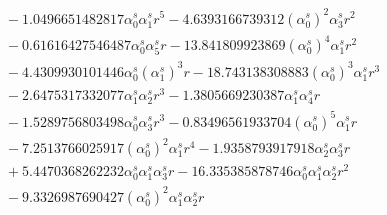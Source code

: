 \documentclass[10pt]{article}
\begin{document}
\begin{align*}
&{}  - 1.0496651482817 \alpha_{0}^s \alpha_{1}^s r^{5} - 4.6393166739312 \left(\alpha_{0}^s\right)^{2} \alpha_{3}^s r^{2} \\
&{}  - 0.61616427546487 \alpha_{0}^s \alpha_{5}^s r - 13.841809923869 \left(\alpha_{0}^s\right)^{4} \alpha_{1}^s r^{2} \\
&{}  - 4.4309930101446 \alpha_{0}^s \left(\alpha_{1}^s\right)^{3} r - 18.743138308883 \left(\alpha_{0}^s\right)^{3} \alpha_{1}^s r^{3} \\
&{}  - 2.6475317332077 \alpha_{1}^s \alpha_{2}^s r^{3} - 1.3805669230387 \alpha_{1}^s \alpha_{4}^s r \\
&{}  - 1.5289756803498 \alpha_{0}^s \alpha_{3}^s r^{3} - 0.83496561933704 \left(\alpha_{0}^s\right)^{5} \alpha_{1}^s r \\
&{}  - 7.2513766025917 \left(\alpha_{0}^s\right)^{2} \alpha_{1}^s r^{4} - 1.9358793917918 \alpha_{2}^s \alpha_{3}^s r \\
&{}  + 5.4470368262232 \alpha_{0}^s \alpha_{1}^s \alpha_{3}^s r - 16.335385878746 \alpha_{0}^s \alpha_{1}^s \alpha_{2}^s r^{2} \\
&{}  - 9.3326987690427 \left(\alpha_{0}^s\right)^{2} \alpha_{1}^s \alpha_{2}^s r
\end{align*}
\end{document}
